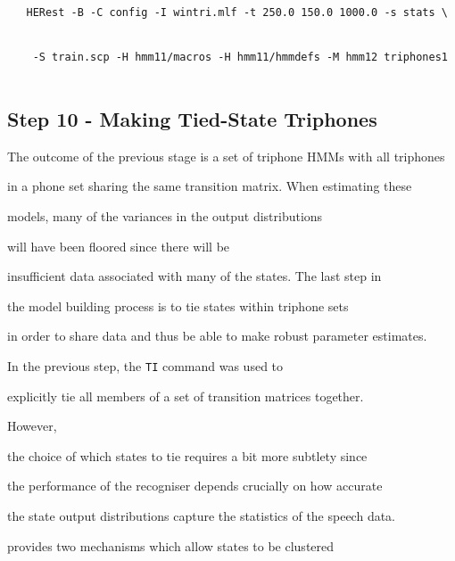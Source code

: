 \begin{verbatim}


   HERest -B -C config -I wintri.mlf -t 250.0 150.0 1000.0 -s stats \


    -S train.scp -H hmm11/macros -H hmm11/hmmdefs -M hmm12 triphones1


\end{verbatim}








\subsection{Step 10 - Making Tied-State Triphones}





The outcome of the previous stage is a set of triphone HMMs with all triphones


in a phone set sharing the same transition matrix.  When estimating these


models, many of the variances in the output distributions


will have been floored since there will be




insufficient data associated with many of the states.  The last step in


the model building process is to tie states within triphone sets


in order to share data and thus be able to make robust parameter estimates.





In the previous step, the \texttt{TI} command was used to


explicitly tie all members of a set of transition matrices together. 


However,


the choice of which states to tie requires a bit more  subtlety since


the performance of the recogniser depends crucially on how accurate


the state output distributions capture the statistics of the speech data.





 provides two mechanisms which allow states to be clustered 


